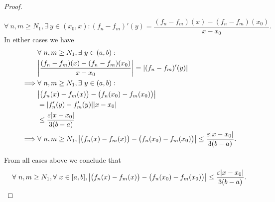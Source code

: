 \begin{proof}
\begin{itemize}
              \[
                  \forall\ n, m \geq N_1, \exists\ y \in (x_0, x) : (f_n - f_m)'(y) = \frac{(f_n - f_m)(x) - (f_n - f_m)(x_0)}{x - x_0}.
              \]
              In either cases we have
              \begin{align*}
                           & \forall\ n, m \geq N_1, \exists\ y \in (a, b) :                                                                                            \\
                           & \abs*{\frac{(f_n - f_m)(x) - (f_n - f_m)(x_0)}{x - x_0}} = \abs*{(f_n - f_m)'(y)}                                                          \\
                  \implies & \forall\ n, m \geq N_1, \exists\ y \in (a, b) :                                                                                            \\
                           & \abs*{\big(f_n(x) - f_m(x)\big) - \big(f_n(x_0) - f_m(x_0)\big)}                                                                           \\
                           & = \abs*{f_n'(y) - f_m'(y)} \abs*{x - x_0}                                                                                                  \\
                           & \leq \frac{\varepsilon \abs*{x - x_0}}{3(b - a)}                                                                                           \\
                  \implies & \forall\ n, m \geq N_1, \abs*{\big(f_n(x) - f_m(x)\big) - \big(f_n(x_0) - f_m(x_0)\big)} \leq \frac{\varepsilon \abs*{x - x_0}}{3(b - a)}.
              \end{align*}
    \end{itemize}
    From all cases above we conclude that
    \[
        \forall\ n, m \geq N_1, \forall\ x \in [a, b], \abs*{\big(f_n(x) - f_m(x)\big) - \big(f_n(x_0) - f_m(x_0)\big)} \leq \frac{\varepsilon \abs*{x - x_0}}{3(b - a)}.
    \]


\end{proof}
